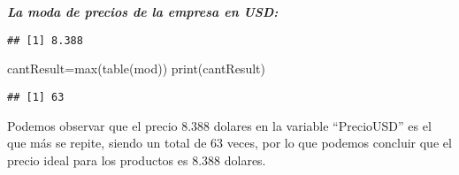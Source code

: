 \documentclass[
]{article}
\newenvironment{Shaded}{\begin{snugshade}}{\end{snugshade}}
\newcommand{\ControlFlowTok}[1]{\textcolor[rgb]{0.13,0.29,0.53}{\textbf{#1}}}
\newcommand{\FunctionTok}[1]{\textcolor[rgb]{0.00,0.00,0.00}{#1}}
\newcommand{\NormalTok}[1]{#1}
\newcommand{\OtherTok}[1]{\textcolor[rgb]{0.56,0.35,0.01}{#1}}
\newcommand{\SpecialCharTok}[1]{\textcolor[rgb]{0.00,0.00,0.00}{#1}}
\begin{document}
\textbf{\emph{La moda de precios de la empresa en USD:}}

\begin{Shaded}
\end{Shaded}

\begin{verbatim}
## [1] 8.388
\end{verbatim}

\begin{Shaded}
\begin{Highlighting}[]
\NormalTok{cantResult}\OtherTok{=}\FunctionTok{max}\NormalTok{(}\FunctionTok{table}\NormalTok{(mod))}
\FunctionTok{print}\NormalTok{(cantResult)}
\end{Highlighting}
\end{Shaded}

\begin{verbatim}
## [1] 63
\end{verbatim}

Podemos observar que el precio 8.388 dolares en la variable
``PrecioUSD'' es el que más se repite, siendo un total de 63 veces, por
lo que podemos concluir que el precio ideal para los productos es 8.388
dolares.
\end{document}
